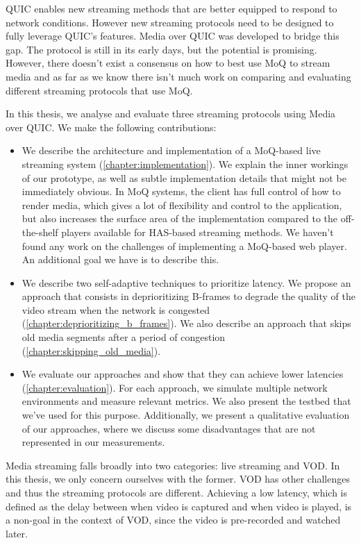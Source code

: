 QUIC enables new streaming methods that are better equipped to respond to network conditions. However new streaming protocols need to be designed to fully leverage QUIC's features. Media over QUIC was developed to bridge this gap. The protocol is still in its early days, but the potential is promising. However, there doesn't exist a consensus on how to best use MoQ to stream media and as far as we know there isn't much work on comparing and evaluating different streaming protocols that use MoQ.

In this thesis, we analyse and evaluate three streaming protocols using Media over QUIC. We make the following contributions:
\begin{itemize}
    \item We describe the architecture and implementation of a MoQ-based live streaming system (\autoref{chapter:implementation}). We explain the inner workings of our prototype, as well as subtle implementation details that might not be immediately obvious. In MoQ systems, the client has full control of how to render media, which gives a lot of flexibility and control to the application, but also increases the surface area of the implementation compared to the off-the-shelf players available for HAS-based streaming methods. %
    We haven't found any work on the challenges of implementing a MoQ-based web player. An additional goal we have is to describe this.
    \item We describe two self-adaptive techniques to prioritize latency. We propose an approach that consists in deprioritizing B-frames to degrade the quality of the video stream when the network is congested (\autoref{chapter:deprioritizing_b_frames}). We also describe an approach that skips old media segments after a period of congestion (\autoref{chapter:skipping_old_media}).
    \item We evaluate our approaches and show that they can achieve lower latencies (\autoref{chapter:evaluation}). For each approach, we simulate multiple network environments and measure relevant metrics. We also present the testbed that we've used for this purpose. Additionally, we present a qualitative evaluation of our approaches, where we discuss some disadvantages that are not represented in our measurements.
\end{itemize}

Media streaming falls broadly into two categories: live streaming and \ac{VOD}. In this thesis, we only concern ourselves with the former. VOD has other challenges and thus the streaming protocols are different. Achieving a low latency, which is defined as the delay between when video is captured and when video is played, is a non-goal in the context of \ac{VOD}, since the video is pre-recorded and watched later.

